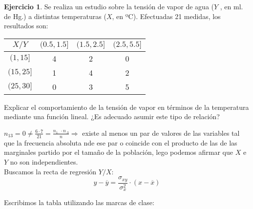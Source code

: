 \documentclass[a4paper, 12pt]{article}
\theoremstyle{definition}
\newtheorem{ej}{Ejercicio}
\begin{document}
\begin{ej}
Se realiza un estudio sobre la tensión de vapor de agua ($Y$ , en ml. de Hg.) a distintas temperaturas
($X$, en ºC). Efectuadas 21 medidas, los resultados son:

\begin{center}
\begin{tabular}{c|ccc}
    $X/Y$ & $(0.5, 1.5]$ & $(1.5, 2.5]$ & $(2.5, 5.5]$ \\
    \hline
    $(1, 15]$ & 4 & 2 & 0 \\
    $(15, 25]$ & 1 & 4 & 2 \\
    $(25, 30]$ & 0 & 3 & 5 \\
\end{tabular}
\end{center}

Explicar el comportamiento de la tensión de vapor en términos de la temperatura mediante una
función lineal. ¿Es adecuado asumir este tipo de relación? \\

\begin{center}
\end{center}

\(n_{13} =  0 \not= \frac{6\cdot7}{21} = \frac{n_{1\cdot}\cdot n_{\cdot3}}{n}\Longrightarrow\) existe al menos un par de valores de las variables tal que la frecuencia absoluta nde ese par o coincide con el producto de las de las marginales partido por el tamaño de la población, lego podemos afirmar que $X$ e $Y$ no son independientes. \\

Buscamos la recta de regresión $Y/X$:
\[
y - \overline{y} = \frac{\sigma_{xy}}{\sigma_{x}^2} \cdot (x - \overline{x})
\]

Escribimos la tabla utilizando las marcas de clase:  \\


\end{ej}
\end{document}
